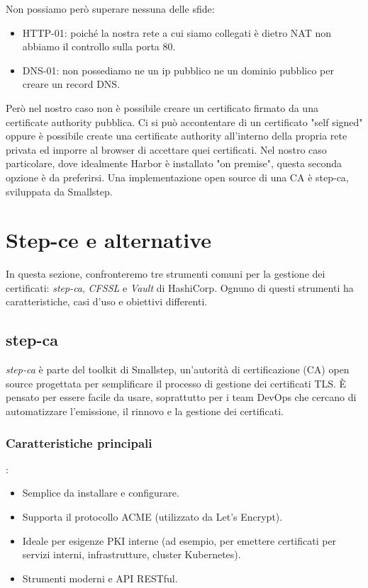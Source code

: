 \documentclass[12pt]{report}
\begin{document}
Non possiamo però superare nessuna delle sfide: 
\begin{itemize}
    \item HTTP-01: poiché la nostra rete a cui siamo collegati è dietro NAT non abbiamo il controllo sulla porta 80.
    \item DNS-01: non possediamo ne un ip pubblico ne un dominio pubblico per creare un record DNS.
\end{itemize}
Però nel nostro caso non è possibile creare un certificato firmato da una certificate authority pubblica.
Ci si può accontentare di un certificato "self signed" oppure è possibile create una certificate authority all'interno della propria rete privata ed imporre al browser di accettare quei certificati. Nel nostro caso particolare, dove idealmente Harbor è installato "on premise", questa seconda opzione è da preferirsi. Una implementazione open source di una CA è step-ca, sviluppata da Smallstep.
\section{Step-ce e alternative}
In questa sezione, confronteremo tre strumenti comuni per la gestione dei certificati: \textit{step-ca}, \textit{CFSSL} e \textit{Vault} di HashiCorp. Ognuno di questi strumenti ha caratteristiche, casi d'uso e obiettivi differenti.

\subsection{step-ca}
\textit{step-ca} è parte del toolkit di Smallstep, un'autorità di certificazione (CA) open source progettata per semplificare il processo di gestione dei certificati TLS. È pensato per essere facile da usare, soprattutto per i team DevOps che cercano di automatizzare l'emissione, il rinnovo e la gestione dei certificati.

\subsubsection{Caratteristiche principali}:
\begin{itemize}
    \item Semplice da installare e configurare.
    \item Supporta il protocollo ACME (utilizzato da Let's Encrypt).
    \item Ideale per esigenze PKI interne (ad esempio, per emettere certificati per servizi interni, infrastrutture, cluster Kubernetes).
    \item Strumenti moderni e API RESTful.
\end{itemize}
\end{document}
